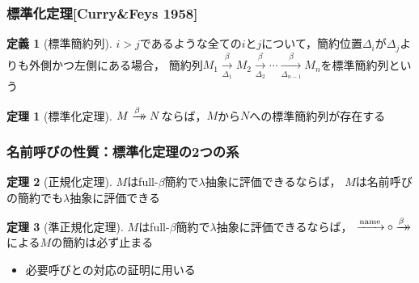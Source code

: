 \documentclass[dvipdfmx,cjk,xcolor=dvipsnames,envcountsect,notheorems,12pt]{beamer}
\theoremstyle{definition}
\newtheorem{definition}{定義}
\newtheorem{theorem}{定理}
\newcommand{\xtwoheadrightarrow}[2][]{%
  \xrightarrow[#1]{#2}\mathrel{\mkern-14mu}\rightarrow
}
\newcommand{\CALLBYNAME}{\xrightarrow{\mathrm{name}}}
\newcommand{\RTCLOSFULLBETA}{\xtwoheadrightarrow{\beta}}
\begin{document}
\begin{frame}
	\frametitle{標準化定理[Curry\&Feys 1958]}
	\large
	\begin{definition}[標準簡約列]
		$i>j$であるような全ての$i$と$j$について，簡約位置$\Delta_i$が$\Delta_j$よりも外側かつ左側にある場合，
		簡約列$M_1\xrightarrow[\Delta_1]{\beta}M_2\xrightarrow[\Delta_2]{\beta} \cdots \xrightarrow[\Delta_{n-1}]{\beta} M_n$を標準簡約列という
	\end{definition}
	\begin{theorem}[標準化定理]
		$M\RTCLOSFULLBETA N$ならば，$M$から$N$への標準簡約列が存在する
	\end{theorem}
\end{frame}

\begin{frame}
	\frametitle{名前呼びの性質：標準化定理の2つの系}
	\large
	\begin{theorem}[正規化定理]
		$M$はfull-$\beta$簡約で$\lambda$抽象に評価できるならば，
		$M$は名前呼びの簡約でも$\lambda$抽象に評価できる
	\end{theorem}
	\begin{theorem}[準正規化定理]
		$M$はfull-$\beta$簡約で$\lambda$抽象に評価できるならば，
		${\CALLBYNAME}\circ{\RTCLOSFULLBETA}$による$M$の簡約は必ず止まる
	\end{theorem}
	\begin{itemize}
		\item 必要呼びとの対応の証明に用いる
	\end{itemize}
\end{frame}
\end{document}
